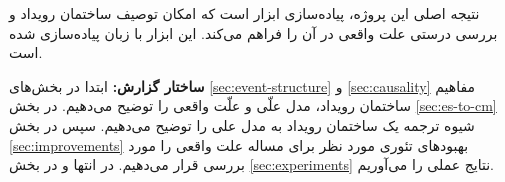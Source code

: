 نتیجه اصلی این پروژه، پیاده‌سازی ابزار
است که امکان توصیف ساختمان رویداد
و بررسی درستی علت واقعی در آن را فراهم می‌کند.
این ابزار با زبان
پیاده‌سازی شده است.

\textbf{ساختار گزارش:}
ابتدا در بخش‌های
\ref{sec:event-structure} و \ref{sec:causality}
مفاهیم ساختمان رویداد، مدل علّی
و علّت واقعی را توضیح می‌دهیم.
در بخش
\ref{sec:es-to-cm}
شیوه ترجمه یک ساختمان رویداد
به مدل علی را توضیح می‌دهیم.
سپس در بخش
\ref{sec:improvements}
بهبودهای تئوری مورد نظر برای مساله
علت واقعی را مورد بررسی قرار می‌دهیم.
در انتها و در بخش
\ref{sec:experiments}
نتایج عملی را می‌آوریم.
